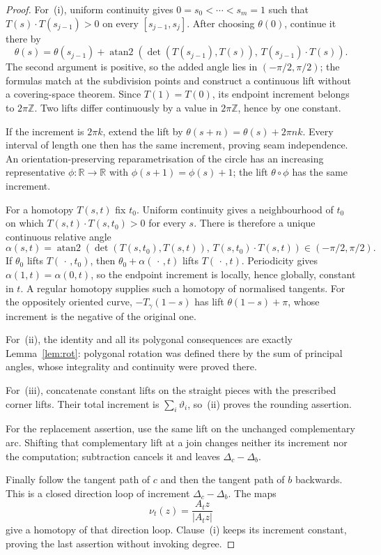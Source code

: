 \begin{proof}
For~(i), uniform continuity gives
$0=s_0<\cdots<s_m=1$ such that
$T(s)\cdot T(s_{j-1})>0$ on every
$[s_{j-1},s_j]$. After choosing $\theta(0)$, continue it there by
\[
 \theta(s)=\theta(s_{j-1})+
 \operatorname{atan2}\!\left(
   \det(T(s_{j-1}),T(s)),\,
   T(s_{j-1})\cdot T(s)\right).
\]
The second argument is positive, so the added angle lies in
$(-\pi/2,\pi/2)$; the formulas match at the subdivision points and construct a
continuous lift without a covering-space theorem. Since $T(1)=T(0)$, its
endpoint increment belongs to $2\pi\mathbb Z$. Two lifts differ continuously
by a value in $2\pi\mathbb Z$, hence by one constant.

If the increment is $2\pi k$, extend the lift by
$\theta(s+n)=\theta(s)+2\pi nk$. Every interval of length one then has the same
increment, proving seam independence. An orientation-preserving
reparametrisation of the circle has an increasing representative
$\phi\colon\mathbb R\to\mathbb R$ with
$\phi(s+1)=\phi(s)+1$; the lift $\theta\circ\phi$ has the same increment.

For a homotopy $T(s,t)$ fix $t_0$. Uniform continuity gives a neighbourhood of
$t_0$ on which
$T(s,t)\cdot T(s,t_0)>0$ for every $s$. There is therefore
a unique continuous relative angle
\[
 \alpha(s,t)=\operatorname{atan2}\!\left(
 \det(T(s,t_0),T(s,t)),\,
 T(s,t_0)\cdot T(s,t)\right)
 \in(-\pi/2,\pi/2).
\]
If $\theta_0$ lifts $T(\,\cdot\,,t_0)$, then
$\theta_0+\alpha(\,\cdot\,,t)$ lifts $T(\,\cdot\,,t)$.
Periodicity gives $\alpha(1,t)=\alpha(0,t)$, so the endpoint increment is
locally, hence globally, constant in $t$. A regular homotopy supplies such a
homotopy of normalised tangents. For the oppositely oriented curve,
$-T_\gamma(1-s)$ has lift $\theta(1-s)+\pi$, whose increment is the negative
of the original one.

For~(ii), the identity and all its polygonal consequences are exactly
Lemma~\ref{lem:rot}: polygonal rotation was defined there by the sum of
principal angles, whose integrality and continuity were proved there.

For~(iii), concatenate constant lifts on the straight pieces with the
prescribed corner lifts. Their total increment is $\sum_i\vartheta_i$, so~(ii)
proves the rounding assertion.

For the replacement assertion, use the same lift on the unchanged
complementary arc. Shifting that complementary lift at a join changes neither
its increment nor the computation; subtraction cancels it and leaves
$\Delta_c-\Delta_b$.

Finally follow the tangent path of $c$ and then the tangent path of $b$
backwards. This is a closed direction loop of increment
$\Delta_c-\Delta_b$. The maps
\[
   \nu_t(z)=\frac{A_tz}{|A_tz|}
\]
give a homotopy of that direction loop. Clause~(i) keeps its increment
constant, proving the last assertion without invoking degree.
\end{proof}

